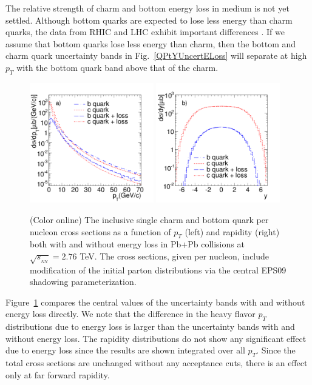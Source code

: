 The relative strength of charm and bottom energy loss in medium is not
yet settled.  Although bottom quarks are expected to lose less energy than
charm quarks, the data from RHIC and LHC exhibit important differences
\cite{PHENIXqm12,CMSqm12}.  If we assume that bottom quarks lose less energy
than charm, then the bottom and charm quark uncertainty bands in 
Fig.~\ref{QPtYUncertELoss} will separate at high $p_T$ with the bottom quark
band above that of the charm.  

\begin{figure}
\includegraphics[width=0.48\textwidth]{chap_DiMuonContinuum_figures/Fig3a_QPt}
\includegraphics[width=0.48\textwidth]{chap_DiMuonContinuum_figures/Fig3b_QRap}
\caption{(Color online) The inclusive single charm and bottom quark 
per nucleon cross sections as a function of $p_T$ (left) and rapidity (right) 
both with and without energy loss in Pb+Pb collisions at 
$\sqrt{s_{_{NN}}}= 2.76$ TeV. The cross sections, given per nucleon, include 
modification of the initial
parton distributions via the central EPS09 shadowing parameterization.}
\label{charm}
\end{figure}

Figure~\ref{charm} compares the central values of the uncertainty bands 
with and without energy loss directly.  We note that the difference in the
heavy flavor $p_T$ distributions due to energy loss is larger than the 
uncertainty bands with and without energy loss.
The rapidity distributions do not show any significant effect due to
energy loss since the results are shown integrated over all $p_T$.  Since the
total cross sections are unchanged without any acceptance cuts, there  is an
effect only at far forward rapidity.



